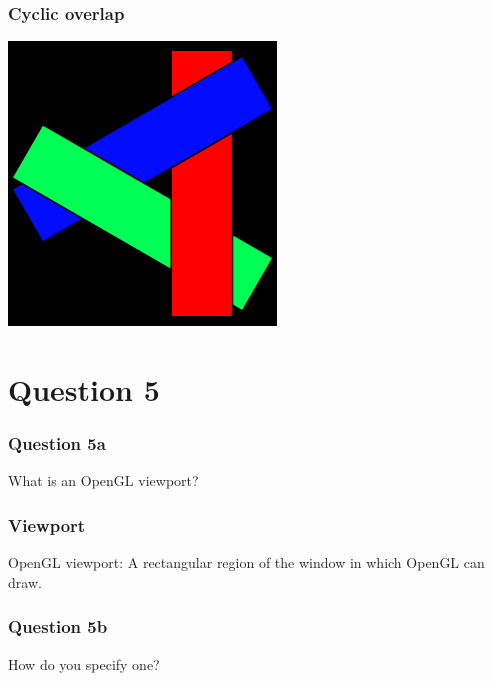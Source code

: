 \documentclass{beamer}
\begin{document}
\begin{frame}
    \frametitle{Cyclic overlap}

    \begin{center}
        \includegraphics[scale=0.6]{cyclic-overlap.png}
    \end{center}

\end{frame}

\section{Question 5}

\begin{frame}
    \frametitle{Question 5a}

    What is an OpenGL viewport?
\end{frame}

\begin{frame}
    \frametitle{Viewport}

    \begin{tcolorbox}
        OpenGL viewport: A rectangular region of the window in which OpenGL can draw.
    \end{tcolorbox}

\end{frame}

\begin{frame}
    \frametitle{Question 5b}

    How do you specify one?
\end{frame}
\end{document}

